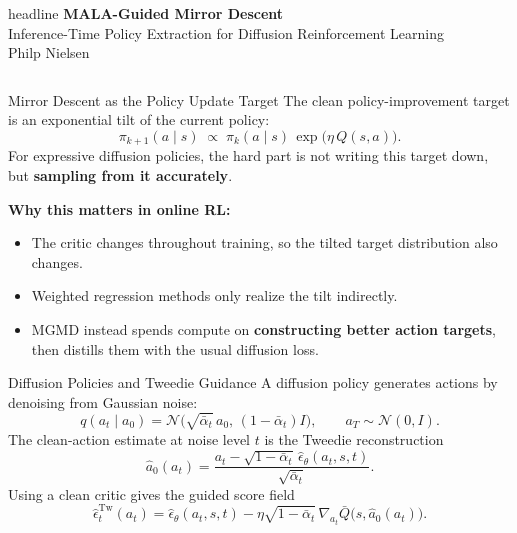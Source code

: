 \documentclass[final,hyperref={pdfpagelabels=false}]{beamer}
\newlength{\colwidth}
\begin{document}
\begin{frame}[t]
\begin{beamercolorbox}[wd=\paperwidth,ht=10cm]{headline}
\vspace{1cm}
\centering
{\fontsize{72}{80}\selectfont\bfseries MALA-Guided Mirror Descent}\\[0.8cm]
{\fontsize{40}{48}\selectfont Inference-Time Policy Extraction for Diffusion Reinforcement Learning}\\[1cm]
{\fontsize{34}{40}\selectfont Philp Nielsen}\\[0.5cm]
\end{beamercolorbox}
\vspace{1cm}
\begin{columns}[t]
\begin{column}{\colwidth}
\begin{block}{\Large Mirror Descent as the Policy Update Target}
\small
The clean policy-improvement target is an exponential tilt of the current policy:
\[
\pi_{k+1}(a\mid s)\;\propto\;\pi_k(a\mid s)\,\exp\!\bigl(\eta\,Q(s,a)\bigr).
\]
For expressive diffusion policies, the hard part is not writing this target down, but \textbf{sampling from it accurately}.

\vspace{0.4em}
\textbf{Why this matters in online RL:}
\begin{itemize}
    \item The critic changes throughout training, so the tilted target distribution also changes.
    \item Weighted regression methods only realize the tilt indirectly.
    \item MGMD instead spends compute on \textbf{constructing better action targets}, then distills them with the usual diffusion loss.
\end{itemize}
\end{block}

\vspace{0.8cm}

\begin{block}{\Large Diffusion Policies and Tweedie Guidance}
\small
A diffusion policy generates actions by denoising from Gaussian noise:
\[
q(a_t\mid a_0)=\mathcal{N}\!\bigl(\sqrt{\bar\alpha_t}\,a_0,\,(1-\bar\alpha_t)I\bigr),
\qquad a_T\sim \mathcal{N}(0,I).
\]
The clean-action estimate at noise level $t$ is the Tweedie reconstruction
\[
\hat a_0(a_t)=\frac{a_t-\sqrt{1-\bar\alpha_t}\,\hat\epsilon_\theta(a_t,s,t)}{\sqrt{\bar\alpha_t}}.
\]
Using a clean critic gives the guided score field
\[
\hat\epsilon_t^{\mathrm{Tw}}(a_t)=\hat\epsilon_\theta(a_t,s,t)-\eta\sqrt{1-\bar\alpha_t}\,\nabla_{a_t}\bar Q\!\bigl(s,\hat a_0(a_t)\bigr).
\]


\end{block}
\end{column}
\end{columns}
\end{frame}
\end{document}
